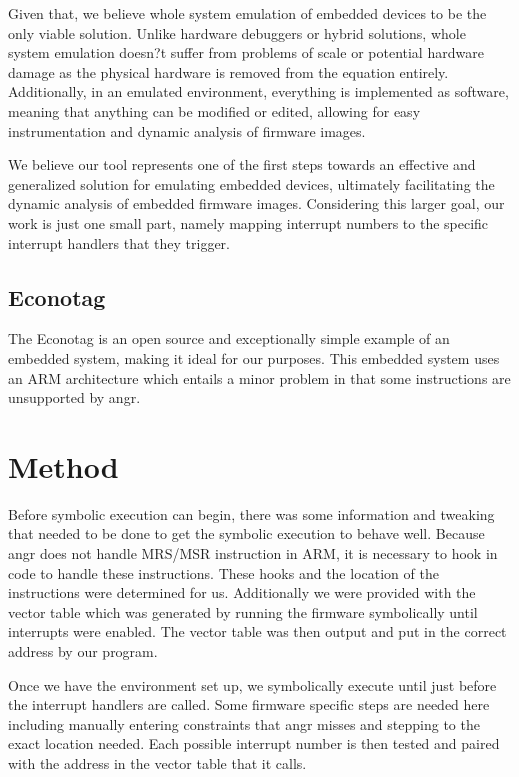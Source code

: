 \documentclass[letterpaper, 10 pt, conference]{ieeeconf}
\begin{document}
Given that, we believe whole system emulation of embedded devices to be the only viable solution. Unlike hardware debuggers or hybrid solutions, whole system emulation doesn?t suffer from problems of scale or potential hardware damage as the physical hardware is removed from the equation entirely. Additionally, in an emulated environment, everything is implemented as software, meaning that anything can be modified or edited, allowing for easy instrumentation and dynamic analysis of firmware images.

We believe our tool represents one of the first steps towards an effective and generalized solution for emulating embedded devices, ultimately facilitating the dynamic analysis of embedded firmware images. Considering this larger goal, our work is just one small part, namely mapping interrupt numbers to the specific interrupt handlers that they trigger.

\subsection{Econotag} %
The Econotag is an open source and exceptionally simple example of an embedded system, making it ideal for our purposes. This embedded system uses an ARM architecture which entails a minor problem in that some instructions are unsupported by angr.

\section{Method}
Before symbolic execution can begin, there was some information and tweaking that needed to be done to get the symbolic execution to behave well. Because angr does not handle MRS/MSR instruction in ARM, it is necessary to hook in code to handle these instructions. These hooks and the location of the instructions were determined for us. Additionally we were provided with the vector table which was generated by running the firmware symbolically until interrupts were enabled. %
The vector table was then output and put in the correct address by our program. 

Once we have the environment set up, we symbolically execute until just before the interrupt handlers are called. Some firmware specific steps are needed here including manually entering constraints that angr misses and stepping to the exact location needed. Each possible interrupt number is then tested and paired with the address in the vector table that it calls.
\end{document}
